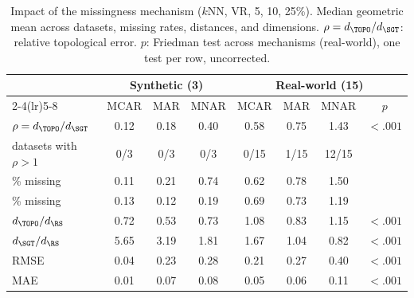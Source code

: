 \begin{table}[t]
    \centering
    \caption{Impact of the missingness mechanism ($k$NN, VR, 5, 10, 25\%). Median geometric mean across datasets, missing rates, distances, and dimensions. $\rho = d_{\TOPO} / d_{\SGT}$: relative topological error. $p$: Friedman test across mechanisms (real-world), one test per row, uncorrected.}
    \label{tab:mechanism}
    \small
    \setlength{\tabcolsep}{10pt}
    \begin{tabular}{l ccc cccc}
        \toprule
        & \multicolumn{3}{c}{Synthetic (3)} & \multicolumn{4}{c}{Real-world (15)} \\
        \cmidrule(lr){2-4}\cmidrule(lr){5-8}
        & MCAR & MAR & MNAR & MCAR & MAR & MNAR & $p$ \\
        \midrule
        $\rho = d_{\TOPO} / d_{\SGT}$ & 0.12 & 0.18 & 0.40 & 0.58 & 0.75 & 1.43 & $<.001$ \\
        \quad datasets with $\rho > 1$ & 0/3 & 0/3 & 0/3 & 0/15 & 1/15 & 12/15 &  \\
        \quad 5\% missing & 0.11 & 0.21 & 0.74 & 0.62 & 0.78 & 1.50 &  \\
        \quad 25\% missing & 0.13 & 0.12 & 0.19 & 0.69 & 0.73 & 1.19 &  \\
        \midrule
        $d_{\TOPO} / d_{\RS}$ & 0.72 & 0.53 & 0.73 & 1.08 & 0.83 & 1.15 & $<.001$ \\
        $d_{\SGT}/d_{\RS}$ & 5.65 & 3.19 & 1.81 & 1.67 & 1.04 & 0.82 & $<.001$ \\
        \midrule
        RMSE & 0.04 & 0.23 & 0.28 & 0.21 & 0.27 & 0.40 & $<.001$ \\
        MAE & 0.01 & 0.07 & 0.08 & 0.05 & 0.06 & 0.11 & $<.001$ \\
        \bottomrule
    \end{tabular}
\end{table}